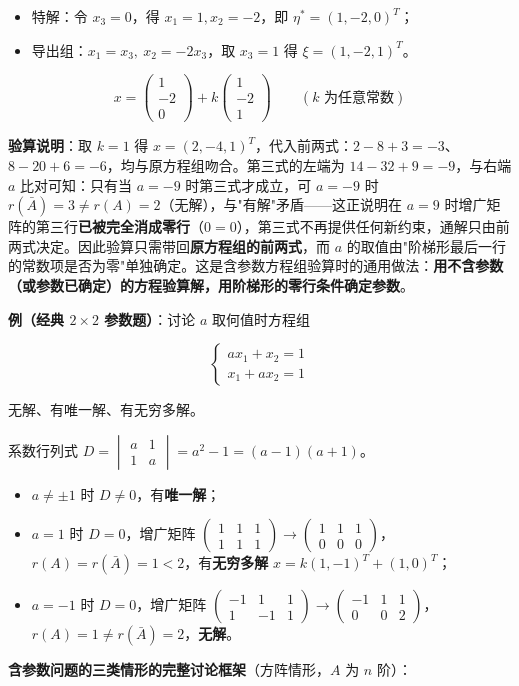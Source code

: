 \documentclass[11pt,openany,UTF8]{ctexbook}
\begin{document}
\begin{itemize}
\item 特解：令 $x_3=0$，得 $x_1=1,x_2=-2$，即 $\eta^*=(1,-2,0)^T$；
\item 导出组：$x_1=x_3,\ x_2=-2x_3$，取 $x_3=1$ 得 $\xi=(1,-2,1)^T$。
\end{itemize}
\[x=\begin{pmatrix} 1 \\ -2 \\ 0 \end{pmatrix}+k\begin{pmatrix} 1 \\ -2 \\ 1 \end{pmatrix}\qquad(k\text{ 为任意常数})\]

\textbf{验算说明}：取 $k=1$ 得 $x=(2,-4,1)^T$，代入前两式：$2-8+3=-3$、$8-20+6=-6$，均与原方程组吻合。第三式的左端为 $14-32+9=-9$，与右端 $a$ 比对可知：只有当 $a=-9$ 时第三式才成立，可 $a=-9$ 时 $r(\bar A)=3\ne r(A)=2$（无解），与"有解"矛盾——这正说明在 $a=9$ 时增广矩阵的第三行\textbf{已被完全消成零行}（$0=0$），第三式不再提供任何新约束，通解只由前两式决定。因此验算只需带回\textbf{原方程组的前两式}，而 $a$ 的取值由"阶梯形最后一行的常数项是否为零"单独确定。这是含参数方程组验算时的通用做法：\textbf{用不含参数（或参数已确定）的方程验算解，用阶梯形的零行条件确定参数}。

\textbf{例（经典 $2\times2$ 参数题）}：讨论 $a$ 取何值时方程组

\[\begin{cases} a x_1+x_2=1 \\ x_1+a x_2=1 \end{cases}\]

无解、有唯一解、有无穷多解。

系数行列式 $D=\begin{vmatrix} a & 1 \\ 1 & a \end{vmatrix}=a^2-1=(a-1)(a+1)$。

\begin{itemize}
\item $a\ne\pm1$ 时 $D\ne0$，有\textbf{唯一解}；
\item $a=1$ 时 $D=0$，增广矩阵 $\begin{pmatrix} 1 & 1 & 1 \\ 1 & 1 & 1 \end{pmatrix}\to\begin{pmatrix} 1 & 1 & 1 \\ 0 & 0 & 0 \end{pmatrix}$，$r(A)=r(\bar A)=1<2$，有\textbf{无穷多解} $x=k(1,-1)^T+(1,0)^T$；
\item $a=-1$ 时 $D=0$，增广矩阵 $\begin{pmatrix} -1 & 1 & 1 \\ 1 & -1 & 1 \end{pmatrix}\to\begin{pmatrix} -1 & 1 & 1 \\ 0 & 0 & 2 \end{pmatrix}$，$r(A)=1\ne r(\bar A)=2$，\textbf{无解}。
\end{itemize}
\textbf{含参数问题的三类情形的完整讨论框架}（方阵情形，$A$ 为 $n$ 阶）：
\end{document}
